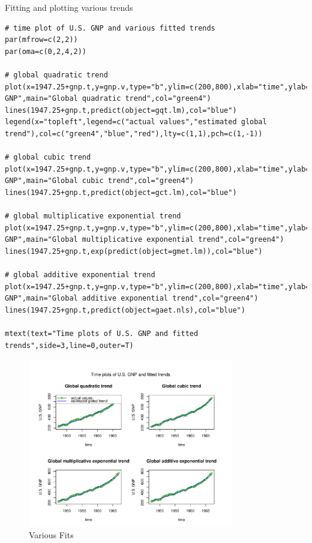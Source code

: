 
Fitting and plotting various trends

\begin{lstlisting}
# time plot of U.S. GNP and various fitted trends
par(mfrow=c(2,2))
par(oma=c(0,2,4,2))

# global quadratic trend
plot(x=1947.25+gnp.t,y=gnp.v,type="b",ylim=c(200,800),xlab="time",ylab="U.S. GNP",main="Global quadratic trend",col="green4")
lines(1947.25+gnp.t,predict(object=gqt.lm),col="blue")
legend(x="topleft",legend=c("actual values","estimated global trend"),col=c("green4","blue","red"),lty=c(1,1),pch=c(1,-1))

# global cubic trend
plot(x=1947.25+gnp.t,y=gnp.v,type="b",ylim=c(200,800),xlab="time",ylab="U.S. GNP",main="Global cubic trend",col="green4")
lines(1947.25+gnp.t,predict(object=gct.lm),col="blue")

# global multiplicative exponential trend
plot(x=1947.25+gnp.t,y=gnp.v,type="b",ylim=c(200,800),xlab="time",ylab="U.S. GNP",main="Global multiplicative exponential trend",col="green4")
lines(1947.25+gnp.t,exp(predict(object=gmet.lm)),col="blue")

# global additive exponential trend
plot(x=1947.25+gnp.t,y=gnp.v,type="b",ylim=c(200,800),xlab="time",ylab="U.S. GNP",main="Global additive exponential trend",col="green4")
lines(1947.25+gnp.t,predict(object=gaet.nls),col="blue")

mtext(text="Time plots of U.S. GNP and fitted trends",side=3,line=0,outer=T)
\end{lstlisting}

\begin{figure}[H]
\centering
\includegraphics[width=0.8\textwidth]{plots/Rplot1.pdf}
\caption{Various Fits}
\end{figure}

